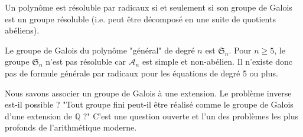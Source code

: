 \begin{theorem}
    Un polynôme est résoluble par radicaux si et seulement si son groupe de Galois est un groupe résoluble (i.e. peut être décomposé en une suite de quotients abéliens).
\end{theorem}

\begin{application}
    Le groupe de Galois du polynôme "général" de degré $n$ est $\mathfrak{S}_n$. Pour $n \ge 5$, le groupe $\mathfrak{S}_n$ n'est pas résoluble car $\mathcal{A}_n$ est simple et non-abélien. Il n'existe donc pas de formule générale par radicaux pour les équations de degré 5 ou plus.
\end{application}

\begin{remark}
    Nous savons associer un groupe de Galois à une extension. Le problème inverse est-il possible ? "Tout groupe fini peut-il être réalisé comme le groupe de Galois d'une extension de $\mathbb{Q}$ ?" C'est une question ouverte et l'un des problèmes les plus profonds de l'arithmétique moderne.
\end{remark}